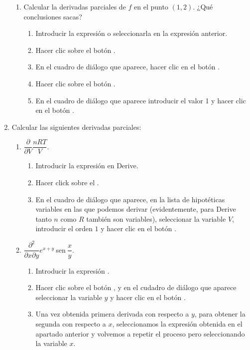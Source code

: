 \begin{enumerate}[leftmargin=*]
\begin{enumerate}
\item Calcular la derivadas parciales de $f$ en el punto $(1,2)$. ¿Qué conclusiones sacas?
\begin{indicacion}
\begin{enumerate}
\item Introducir la expresión  o seleccionarla en la expresión anterior. 
\item Hacer clic sobre el botón .
\item En el cuadro de diálogo que aparece, hacer clic en el botón .
\item Hacer clic sobre el botón .
\item En el cuadro de diálogo que aparece introducir el valor 1 y hacer clic en el botón .
\end{enumerate}
\end{indicacion}
\end{enumerate}


\item  Calcular las siguientes derivadas parciales:
\begin{enumerate}
\item  $\dfrac{\partial }{\partial V}\dfrac{nRT}{V}.$

\begin{indicacion}
\begin{enumerate}
\item Introducir la expresión en Derive.
\item Hacer click sobre el .
\item En el cuadro de diálogo que aparece, en la lista de hipotéticas variables en las que podemos derivar
(evidentemente, para Derive tanto $n$ como $R$ también son variables), seleccionar la variable $V$, introducir el orden
$1$ y hacer clic en el botón .
\end{enumerate}
\end{indicacion}

\item  $\dfrac{\partial ^{2}}{\partial x\partial y}e^{x+y}\ $sen$\ \dfrac{x}{y}.$
\begin{indicacion}
\begin{enumerate}
\item Introducir la expresión .
\item Hacer clic sobre el botón , y en el cudadro de diálogo que aparece
seleccionar la variable $y$ y hacer clic en el botón .
\item Una vez obtenida primera derivada con respecto a $y$, para obtener la segunda con respecto a $x$, seleccionamos la
expresión obtenida en el apartado anterior y volvemos a repetir el proceso pero seleccionando la variable
$x$.
\end{enumerate}
\end{indicacion}
\end{enumerate}


\end{enumerate}
